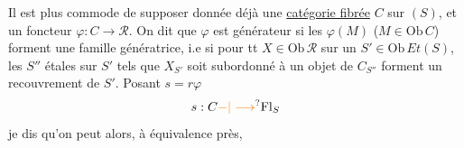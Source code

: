 Il est plus commode de supposer donnée déjà une \uline{catégorie fibrée} $C$ sur $(S)$, et un foncteur  $\varphi:C\longrightarrow\mathscr R$. On dit que $\varphi$ est générateur si les $\varphi(M)$ ($M\in\mathrm{Ob}\,C$) forment une famille génératrice, i.e si pour tt $X\in\mathrm{Ob}\,\mathscr R$ sur un $S'\in\mathrm{Ob}\,Et(S)$, les $S''$ étales sur $S'$ tels que $X_{S'}$ soit subordonné à un objet  de $C_{S''}$  forment un recouvrement de $S'$. Posant $s=r\varphi$
\[
s:C\unsure{-|\longrightarrow}\mathrm{Fl}_S
\]
je dis qu'on peut alors, à équivalence près,
